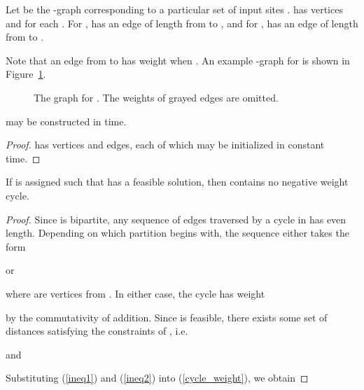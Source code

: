 \documentclass{llncs}
\def \figurescale {.85}
\begin{document}
\begin{definition}
\label{definition:G}
Let  be the -graph corresponding to a particular set of input sites .   has vertices  and  for each .  For ,  has an edge of length  from  to , and for ,  has an edge of length  from  to .
\end{definition}

\noindent Note that an edge from  to  has weight  when .  An example -graph  for  is shown in Figure~\ref{figure:G}.

\begin{figure}
\centering
\scalebox{\figurescale}{\texttt{[image: G.eps]}}
\caption{The graph  for .  The weights of grayed edges are omitted.}
\label{figure:G}
\end{figure}

\begin{lemma}
\label{lemma:make_graph_basics}
 may be constructed in  time.
\end{lemma}

\begin{proof}
 has  vertices and  edges, each of which may be initialized in constant time.
\end{proof}


\begin{lemma}
\label{lemma:nnwc_implies_feasible}
If  is assigned such that  has a feasible solution, then  contains no negative weight cycle.
\end{lemma}

\begin{proof}
Since  is bipartite, any sequence of edges  traversed by a cycle in  has even length.  Depending on which partition  begins with, the sequence either takes the form

\noindent or

\noindent where  are vertices from .  In either case, the cycle has weight

\noindent by the commutativity of addition.  Since  is feasible, there exists some set of distances  satisfying the constraints of , i.e.

\noindent and

\noindent Substituting (\ref{ineq1}) and (\ref{ineq2}) into (\ref{cycle_weight}), we obtain

\end{proof}
\end{document}
